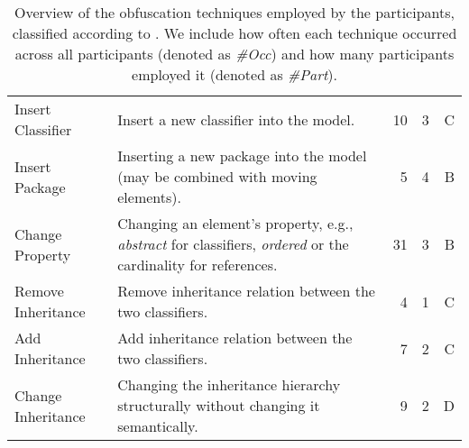 \begin{table*}[t]
\begin{tabular}{l p{215pt} r r r}
		Insert Classifier  & Insert a new classifier into the model.                                           & 10   & 3    & C                     \\
		Insert Package     & Inserting a new package into the model (may be combined with moving elements).    & 5    & 4    & B                     \\
		\midrule
        Change Property    & Changing an element's property, e.g., \textit{abstract} for classifiers, \textit{ordered} or the cardinality for references. & 31    & 3    & B                     \\
		\midrule
		Remove Inheritance & Remove inheritance relation between the two classifiers.                          & 4    & 1    & C                     \\
        Add Inheritance    & Add inheritance relation between the two classifiers.                             & 7    & 2    & C                     \\
		Change Inheritance & Changing the inheritance hierarchy structurally without changing it semantically. & 9    & 2    & D                     \\
		\bottomrule
	\end{tabular}
    \caption[Obfuscation Techniques by Novice Modelers]{Overview of the obfuscation techniques employed by the participants, classified according to \citet{Babur2019}. We include how often each technique occurred across all participants (denoted as \textit{\#Occ}) and how many participants employed it (denoted as \textit{\#Part}).}
	\label{tab:student-obfuscation}
\end{table*}

